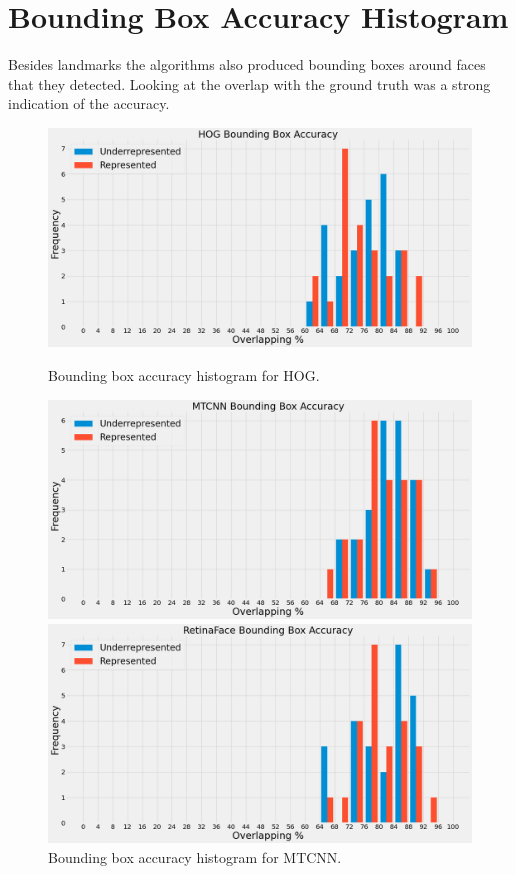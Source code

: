 \documentclass{l4proj}
\begin{document}
\section{Bounding Box Accuracy Histogram}
Besides landmarks the algorithms also produced bounding boxes around faces that they detected. Looking at the overlap with the ground truth was a strong indication of the accuracy.
\begin{figure}[h!]
  \centering
  \begin{minipage}{0.49\textwidth}
    \includegraphics[width=\textwidth]{images/dlib_box.png}
    \caption{Bounding box accuracy histogram for HOG.}
    \label{dlib_box}
  \end{minipage}
  \hfill
  \begin{minipage}{0.49\textwidth}
    \includegraphics[width=\textwidth]{images/mtcnn_box.png}
    \caption{Bounding box accuracy histogram for MTCNN.}
    \label{mtcnn_box}
  \end{minipage}
  \hfill
  \begin{minipage}{0.49\textwidth}
    \includegraphics[width=\textwidth]{images/retinaface_box.png}

\end{minipage}
\end{figure}
\end{document}
